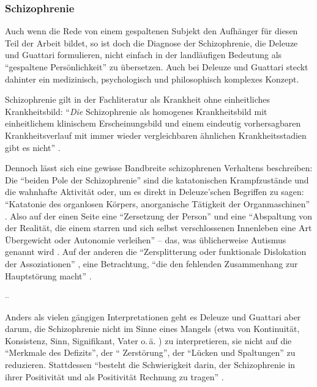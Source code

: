 \documentclass[12pt,
               DIV13,
               paper=a4,
               twoside=false,
               onehalfspacing,
               bibliography=totoc,
               toc=graduated,
               draft,
               ]{scrartcl}
\newcommand{\pc}[2]{\parencite[#1]{#2}}
\newcommand{\vgl}[2]{\parencite[vgl.][#1]{#2}}
\begin{document}
\subsubsection{Schizophrenie}

Auch wenn die Rede von einem gespaltenen Subjekt den Aufhänger für
diesen Teil der Arbeit bildet, so ist doch die Diagnose der
Schizophrenie, die Deleuze und Guattari formulieren, nicht einfach in
der landläufigen Bedeutung als "`gespaltene Persönlichkeit"' zu
übersetzen. Auch bei Deleuze und Guattari steckt dahinter ein
medizinisch, psychologisch und philosophisch komplexes Konzept.

Schizophrenie gilt in der Fachliteratur als Krankheit ohne
einheitliches Krankheitsbild: "`\emph{Die} Schizophrenie als homogenes
Krankheitsbild mit einheitlichem klinischem Erscheinungsbild und einem
eindeutig vorhersagbaren Krankheitsverlauf mit immer wieder
vergleichbaren ähnlichen Krankheitsstadien gibt es nicht"'
\pc{799}{psych}.

Dennoch lässt sich eine gewisse Bandbreite schizophrenen Verhaltens
beschreiben: Die "`beiden Pole der Schizophrenie"' \pc{21}{schizg}
sind die katatonischen Krampfzustände und die wahnhafte Aktivität
oder, um es direkt in Deleuze'schen Begriffen zu sagen: "`Katatonie
des organlosen Körpers, anorganische Tätigkeit der Organmaschinen"'
\pc{21}{schizg}. Also auf der einen Seite eine "`Zersetzung der
Person"' und eine "`Abspaltung von der Realität, die einem starren und
sich selbst verschlossenen Innenleben eine Art Übergewicht oder
Autonomie verleihen"' \pc{23}{schizg} -- das, was üblicherweise
Autismus genannt wird \vgl{801}{psych}. Auf der anderen die
"`Zersplitterung oder funktionale Dislokation der Assoziationen"'
\pc{23}{schizg}, eine Betrachtung, "`die den fehlenden Zusammenhang
zur Hauptstörung macht"' \pc{23}{schizg}.

--

Anders als vielen gängigen Interpretationen geht es Deleuze und
Guattari aber darum, die Schizophrenie nicht im Sinne eines Mangels
(etwa von Kontinuität, Konsistenz, Sinn, Signifikant, Vater o.\,ä.
\vgl{xx}{schizg}) zu interpretieren, sie nicht auf die "`Merkmale des
Defizits"', der "` Zerstörung"', der "`Lücken und Spaltungen"'
\pc{24}{schizg} zu reduzieren. Stattdessen "`besteht die Schwierigkeit
darin, der Schizophrenie in ihrer Positivität und als Positivität
Rechnung zu tragen"' \pc{24}{schizg}.
\end{document}

